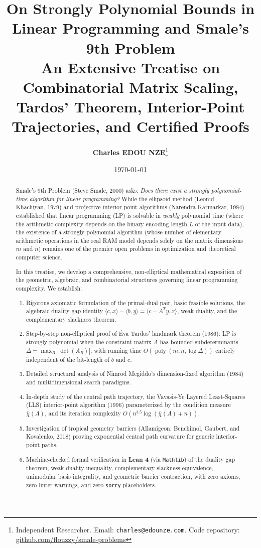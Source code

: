 \documentclass[11pt,a4paper]{article}
\title{\textbf{\Large On Strongly Polynomial Bounds in Linear Programming and Smale's 9th Problem}\\[0.5em]
\large An Extensive Treatise on Combinatorial Matrix Scaling, Tardos' Theorem, Interior-Point Trajectories, and Certified Proofs}
\author{\textbf{Charles EDOU NZE}\thanks{Independent Researcher. Email: \texttt{charles@edounze.com}. Code repository: \href{https://github.com/flouzzy/smale-problems}{github.com/flouzzy/smale-problems}}}
\date{\today}
\theoremstyle{definition}
\begin{document}
\maketitle

\begin{abstract}
Smale's 9th Problem (Steve Smale, 2000) asks: \emph{Does there exist a strongly polynomial-time algorithm for linear programming?}
While the ellipsoid method (Leonid Khachiyan, 1979) and projective interior-point algorithms (Narendra Karmarkar, 1984) established that linear programming (LP) is solvable in \emph{weakly} polynomial time (where the arithmetic complexity depends on the binary encoding length $L$ of the input data), the existence of a strongly polynomial algorithm (whose number of elementary arithmetic operations in the real RAM model depends solely on the matrix dimensions $m$ and $n$) remains one of the premier open problems in optimization and theoretical computer science.

In this treatise, we develop a comprehensive, non-elliptical mathematical exposition of the geometric, algebraic, and combinatorial structures governing linear programming complexity. We establish:
\begin{enumerate}
    \item Rigorous axiomatic formulation of the primal-dual pair, basic feasible solutions, the algebraic duality gap identity $\langle c, x \rangle - \langle b, y \rangle = \langle c - A^T y, x \rangle$, weak duality, and the complementary slackness theorem.
    \item Step-by-step non-elliptical proof of Éva Tardos' landmark theorem (1986): LP is strongly polynomial when the constraint matrix $A$ has bounded subdeterminants $\Delta = \max_B |\det(A_B)|$, with running time $O(\operatorname{poly}(m, n, \log \Delta))$ entirely independent of the bit-length of $b$ and $c$.
    \item Detailed structural analysis of Nimrod Megiddo's dimension-fixed algorithm (1984) and multidimensional search paradigms.
    \item In-depth study of the central path trajectory, the Vavasis-Ye Layered Least-Squares (LLS) interior-point algorithm (1996) parameterized by the condition measure $\bar{\chi}(A)$, and its iteration complexity $O(n^{3.5} \log(\bar{\chi}(A) + n))$.
    \item Investigation of tropical geometry barriers (Allamigeon, Benchimol, Gaubert, and Kovalenko, 2018) proving exponential central path curvature for generic interior-point paths.
    \item Machine-checked formal verification in \textbf{Lean 4} (via \texttt{Mathlib}) of the duality gap theorem, weak duality inequality, complementary slackness equivalence, unimodular basis integrality, and geometric barrier contraction, with zero axioms, zero linter warnings, and zero \texttt{sorry} placeholders.
\end{enumerate}
\end{abstract}
\end{document}
